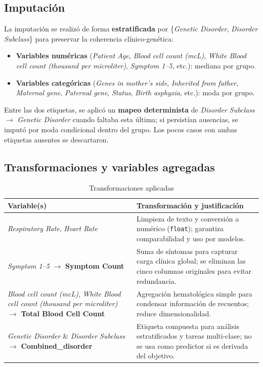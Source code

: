 \documentclass[11pt,a4paper,spanish]{book}
\numberwithin{equation}{chapter}
\numberwithin{figure}{chapter}
\begin{document}
\subsection*{Imputación}
La imputación se realizó de forma \textbf{estratificada} por \{\textit{Genetic Disorder}, \textit{Disorder Subclass}\} para preservar la coherencia clínico-genética:
\begin{itemize}
    \item \textbf{Variables numéricas} (\textit{Patient Age}, \textit{Blood cell count (mcL)}, \textit{White Blood cell count (thousand per microliter)}, \textit{Symptom 1--5}, etc.): mediana por grupo.
    \item \textbf{Variables categóricas} (\textit{Genes in mother's side}, \textit{Inherited from father}, \textit{Maternal gene}, \textit{Paternal gene}, \textit{Status}, \textit{Birth asphyxia}, etc.): moda por grupo.
\end{itemize}
Entre las dos etiquetas, se aplicó un \textbf{mapeo determinista} de \textit{Disorder Subclass} $\rightarrow$ \textit{Genetic Disorder} cuando faltaba esta última; si persistían ausencias, se imputó por moda condicional dentro del grupo. Los pocos casos con ambas etiquetas ausentes se descartaron.

\subsection*{Transformaciones y variables agregadas}

\begin{table}[htbp]
\centering
\caption{Transformaciones aplicadas}
\begin{tabularx}{\textwidth}{|p{3.5cm}|X|}
\hline
\textbf{Variable(s)} & \textbf{Transformación y justificación} \\
\hline
\textit{Respiratory Rate}, \textit{Heart Rate} & Limpieza de texto y conversión a numérico (\texttt{float}); garantiza comparabilidad y uso por modelos. \\
\textit{Symptom 1--5} $\rightarrow$ \textbf{Symptom Count} & Suma de síntomas para capturar carga clínica global; se eliminan las cinco columnas originales para evitar redundancia. \\
\textit{Blood cell count (mcL)}, \textit{White Blood cell count (thousand per microliter)} $\rightarrow$ \textbf{Total Blood Cell Count} & Agregación hematológica simple para condensar información de recuentos; reduce dimensionalidad. \\
\textit{Genetic Disorder} \& \textit{Disorder Subclass} $\rightarrow$ \textbf{Combined\_disorder} & Etiqueta compuesta para análisis estratificados y tareas multi-clase; no se usa como predictor si es derivada del objetivo. \\
\hline
\end{tabularx}
\label{tab:transforms}
\end{table}
\end{document}

